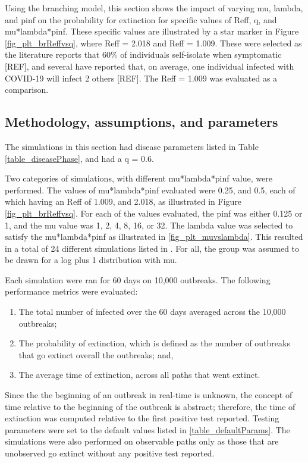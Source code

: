 \documentclass[sr]{drdc-report}
\begin{document}
Using the branching model, this section shows the impact of varying mu, lambda, and pinf on the probability for extinction for specific values of Reff, q, and mu*lambda*pinf. These specific values are illustrated by a star marker in Figure \ref{fig_plt_brReffvsq}, where Reff = 2.018 and Reff = 1.009. These were selected as the literature reports that 60\% of individuals self-isolate when symptomatic [REF], and several have reported that, on average, one individual infected with COVID-19 will infect 2 others [REF]. The Reff = 1.009 was evaluated as a comparison.
 
\subsection{Methodology, assumptions, and parameters} 

The simulations in this section had disease parameters listed in Table \ref{table_diseasePhase}, and had a q = 0.6.  

Two categories of simulations, with different mu*lambda*pinf value, were performed. The values of mu*lambda*pinf evaluated were 0.25, and 0.5, each of which having an Reff of 1.009, and 2.018, as illustrated in Figure \ref{fig_plt_brReffvsq}. For each of the values evaluated, the pinf was either 0.125 or 1, and the mu value was 1, 2, 4, 8, 16, or 32. The lambda value was selected to satisfy the mu*lambda*pinf as illustrated in \ref{fig_plt_muvslambda}. This resulted in a total of 24 different simulations listed in \label{table_simIparams}. For all, the group was assumed to be drawn for a log plus 1 distribution with mu. 

Each simulation were ran for 60 days on 10,000 outbreaks. The following performance metrics were evaluated:

\begin{enumerate}
\item The total number of infected over the 60 days averaged across the 10,000 outbreaks;
\item The probability of extinction, which is defined as the number of outbreaks that go extinct overall the outbreaks; and,
\item The average time of extinction, across all paths that went extinct. 
\end{enumerate}

Since the the beginning of an outbreak in real-time is unknown, the concept of time relative to the beginning of the outbreak is abstract; therefore, the time of extinction was computed relative to the first positive test reported. Testing parameters were set to the default values listed in \ref{table_defaultParams}. The simulations were also performed on observable paths only as those that are unobserved go extinct without any positive test reported. 
\end{document}
